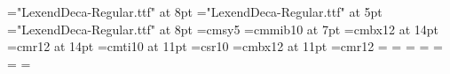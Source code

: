 \newfam\ChordFam
\font\ChordFontText="LexendDeca-Regular.ttf" at 8pt  %
\font\ChordFontExp="LexendDeca-Regular.ttf" at 5pt %
\font\ChordFontBass="LexendDeca-Regular.ttf" at 8pt  %
\font\ChordFontExpSymb=cmsy5
\font\ChordSymb=cmmib10 at 7pt %
%
\font\SongNameFont=cmbx12 at 14pt
\font\ReferenceFont=cmr12 at 14pt
\font\AuthorFont=cmti10 at 11pt
%
\font\TextFont=csr10
\font\PageFont=cmbx12 at 11pt
\font\IndexFont=cmr12
%
\textfont\ChordFam=\ChordFontText
\scriptfont\ChordFam=\ChordFontExp
\scriptscriptfont\ChordFam=\ChordFontBass
{}=\ChordFontExpSymb
{}=\ChordSymb
{}=\ChordSymb
{}=\ChordSymb
\def\setformatA{\fam=\ChordFam\textstyle} 
\def\setformatB{\fam=\ChordFam\scriptstyle}
\def\setformatC{\fam=\ChordFam\scriptscriptstyle}
\def\MakeBase#1{\csname MakeTone#1\endcsname}
\def\MakeToneA{A\kern-.13em}
\def\MakeToneB{B}
\def\MakeToneC{C}
\def\MakeToneD{D}
\def\MakeToneE{E}
\def\MakeToneF{F}
\def\MakeToneG{G}
\def\MakeToneH{H}
\def\MakeScrut{{\setbox0=\hbox{H}\vbox to \ht0{}}}
\def\MakeFlat{^\flat\kern-.09em\MakeScrut}
\def\MakeSharp{^\sharp\kern-.09em\MakeScrut}
\def\MakeExpPlus{{\ChordFontExp\raise+.2ex\hbox{+}}}
\def\MakeExpMinus{{-}}
\def\MakeBasePlus{{\ChordFontText\raise+.2ex\hbox{+}}}
\def\MakeBaseMinus{{\scriptstyle -}}
\def\MakeAfterExpKern{\kern-.1em} %
\def\MakeBassRaise{-.3ex}  %
\def\fixchordspace{0.4em}  %
\def\pluschordspace{0.3em} %
\def\chordraise{2.2ex}     %
\def\MakeSongHeader#1#2#3#4#5{{%
  \noindent\SongNameFont\unspace#1%
  \write\TOCfile{\string\tocline{#1}{\the\pageno}}%
  \if:#5:\else%
  { }(\unspace#5)%
  \if:#2:\else%
  \hfill\bgroup\TextFont(\hskip.3em{\AuthorFont\unspace#2\/}\hskip.3em)\egroup
  \fi\fi\par%
  \penalty 10000%
}}
